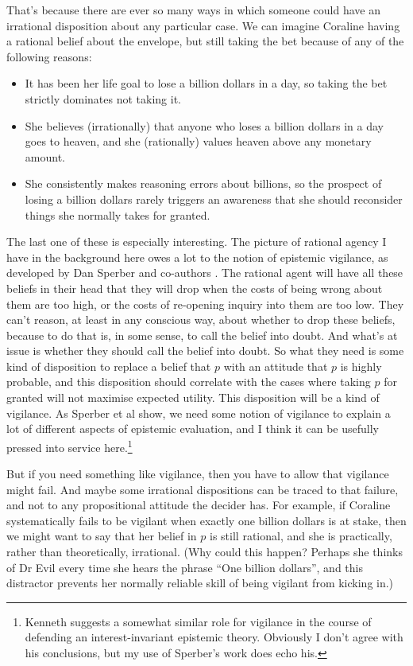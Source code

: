 \documentclass[11pt,]{book}
\providecommand{\tightlist}{%
  \setlength{\itemsep}{0pt}\setlength{\parskip}{0pt}}
\let\rmarkdownfootnote\footnote%
\def\footnote{\protect\rmarkdownfootnote}
\begin{document}
That's because there are ever so many ways in which someone could have an irrational disposition about any particular case. We can imagine Coraline having a rational belief about the envelope, but still taking the bet because of any of the following reasons:

\begin{itemize}
\tightlist
\item
  It has been her life goal to lose a billion dollars in a day, so taking the bet strictly dominates not taking it.
\item
  She believes (irrationally) that anyone who loses a billion dollars in a day goes to heaven, and she (rationally) values heaven above any monetary amount.
\item
  She consistently makes reasoning errors about billions, so the prospect of losing a billion dollars rarely triggers an awareness that she should reconsider things she normally takes for granted.
\end{itemize}

The last one of these is especially interesting. The picture of rational agency I have in the background here owes a lot to the notion of epistemic vigilance, as developed by Dan Sperber and co-authors \citep{SperberEtAl2010}. The rational agent will have all these beliefs in their head that they will drop when the costs of being wrong about them are too high, or the costs of re-opening inquiry into them are too low. They can't reason, at least in any conscious way, about whether to drop these beliefs, because to do that is, in some sense, to call the belief into doubt. And what's at issue is whether they should call the belief into doubt. So what they need is some kind of disposition to replace a belief that \(p\) with an attitude that \(p\) is highly probable, and this disposition should correlate with the cases where taking \(p\) for granted will not maximise expected utility. This disposition will be a kind of vigilance. As Sperber et al show, we need some notion of vigilance to explain a lot of different aspects of epistemic evaluation, and I think it can be usefully pressed into service here.\footnote{Kenneth \citet{Boyd2015} suggests a somewhat similar role for vigilance in the course of defending an interest-invariant epistemic theory. Obviously I don't agree with his conclusions, but my use of Sperber's work does echo his.}

But if you need something like vigilance, then you have to allow that vigilance might fail. And maybe some irrational dispositions can be traced to that failure, and not to any propositional attitude the decider has. For example, if Coraline systematically fails to be vigilant when exactly one billion dollars is at stake, then we might want to say that her belief in \(p\) is still rational, and she is practically, rather than theoretically, irrational. (Why could this happen? Perhaps she thinks of Dr Evil every time she hears the phrase ``One billion dollars'', and this distractor prevents her normally reliable skill of being vigilant from kicking in.)
\end{document}
